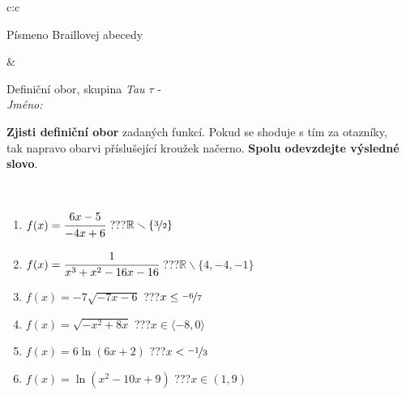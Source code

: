 \documentclass[10pt]{report}
\begin{document}
\begin{tabular}{c:c}
\begin{minipage}[c][104.5mm][t]{0.5\linewidth}
\begin{center}
\begin{minipage}{0.20\linewidth}
\begin{center}
{\small Písmeno Braillovej abecedy}
\end{center}
\end{minipage}
\end{center}
\end{minipage}
&
\begin{minipage}[c][104.5mm][t]{0.5\linewidth}
\begin{center}
\vspace{7mm}
{\huge Definiční obor, skupina \textit{Tau $\tau$} -}\\[5mm]
\textit{Jméno:}\phantom{xxxxxxxxxxxxxxxxxxxxxxxxxxxxxxxxxxxxxxxxxxxxxxxxxxxxxxxxxxxxxxxxx}\\[5mm]
\begin{minipage}{0.95\linewidth}
\begin{center}
\textbf{Zjisti definiční obor} zadaných funkcí. Pokud se shoduje s tím za otazníky,\\tak napravo obarvi příslušející kroužek načerno. \textbf{Spolu odevzdejte výsledné slovo}.
\end{center}
\end{minipage}
\\[1mm]
\begin{minipage}{0.79\linewidth}
\begin{center}
\begin{varwidth}{\linewidth}
\begin{enumerate}
\normalsizerrr
\item $f(x)=\cfrac{6x-5}{-4x+6}$\quad \dotfill\; ???\;\dotfill \quad $\mathbb{R}\smallsetminus\{\nicefrac{3}{2}\}$
\item $f(x)=\cfrac{1}{x^3+x^2-16x-16}$\quad \dotfill\; ???\;\dotfill \quad $\mathbb{R}\smallsetminus\{4,-4,-1\}$
\item $f(x)=-7\sqrt{-7x-6}$\quad \dotfill\; ???\;\dotfill \quad $x\leq\nicefrac{-6}{7}$
\item $f(x)=\sqrt{-x^2+8x}$\quad \dotfill\; ???\;\dotfill \quad $x\in\langle-8 , 0\rangle$
\item $f(x)=6\ln{(6x+2)}$\quad \dotfill\; ???\;\dotfill \quad $x<\nicefrac{-1}{3}$
\item $f(x)=\ln{(x^2-10x+9)}$\quad \dotfill\; ???\;\dotfill \quad $x\in(1 , 9)$
\end{enumerate}
\end{varwidth}
\end{center}
\end{minipage}
\begin{minipage}{0.20\linewidth}
\begin{center}

\end{center}
\end{minipage}
\end{center}
\end{minipage}
\end{tabular}
\end{document}

